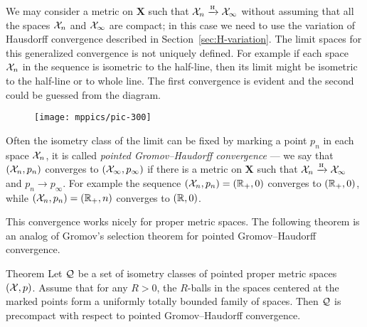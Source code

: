 We may consider a metric on $\bm{X}$ such that $\mathcal{X}_n\xrightarrow{\mbox{\tiny H}} \mathcal{X}_\infty$ without assuming that all the spaces $\mathcal{X}_n$ and $\mathcal{X}_\infty$ are compact; in this case we need to use the variation of Hausdorff convergence described in Section~\ref{sec:H-variation}.
The limit spaces for this generalized convergence is not uniquely defined.
For example if each space $\mathcal{X}_n$ in the sequence is isometric to the half-line, then its limit might be isometric to the half-line or to whole line.
The first convergence is evident and the second could be guessed from the diagram.

\begin{figure}[h!]
\vskip-0mm
\centering
\texttt{[image: mppics/pic-300]}
\end{figure}

Often the isometry class of the limit can be fixed by marking a point $p_n$ in each space $\mathcal{X}_n$, it is called \emph{pointed Gromov--Haudorff convergence} --- we say that $(\mathcal{X}_n,p_n)$ converges to $(\mathcal{X}_\infty,p_\infty)$ if there is a metric on $\bm{X}$ such that $\mathcal{X}_n\xrightarrow{\mbox{\tiny H}} \mathcal{X}_\infty$ and $p_n\to p_\infty$.
For example the sequence $(\mathcal{X}_n,p_n)=(\mathbb{R}_+,0)$ converges to $(\mathbb{R}_+,0)$, while $(\mathcal{X}_n,p_n)=(\mathbb{R}_+,n)$ converges to $(\mathbb{R},0)$.

This convergence works nicely for proper metric spaces.
The following theorem is an analog of Gromov's selection theorem for pointed Gromov--Haudorff convergence.

\begin{thm}{Theorem}\label{thm:pointed-gromov-compactness}%
Let $\mathcal{Q}$ be a set of isometry classes of pointed proper metric spaces
$(\mathcal{X},p)$.
Assume that for any $R>0$, the $R$-balls in the spaces centered at the marked points form a uniformly totally bounded family of spaces.
Then $\mathcal{Q}$ is precompact with respect to pointed Gromov--Haudorff convergence. 
\end{thm}
